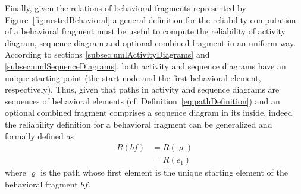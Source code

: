 Finally, given the relations of behavioral fragments represented by
Figure~\ref{fig:nestedBehavioral} a general definition for the
reliability computation of a behavioral fragment must be useful to
compute the reliability of activity diagram, sequence diagram and optional
combined fragment in an uniform way. According to 
sections \ref{subsec:umlActivityDiagrams} and \ref{subsec:umlSequenceDiagrams},
both activity and sequence diagrams have an unique starting point (the start
node and the first behavioral element, respectively). Thus, given that paths in
activity and sequence diagrams are sequences of behavioral elements (cf.
Definition~\ref{eq:pathDefinition}) and an optional combined fragment comprises
a sequence diagram in its inside, indeed the reliability definition for a
behavioral fragment can be generalized and formally defined as \begin{align}
	R(bf) &= R(\varrho) \nonumber \\
              &= R(e_1) \label{eq:behavioralFragmentReliability} \end{align} where $\varrho$ is the path whose
first element is the unique starting element of the behavioral fragment $bf$. 


